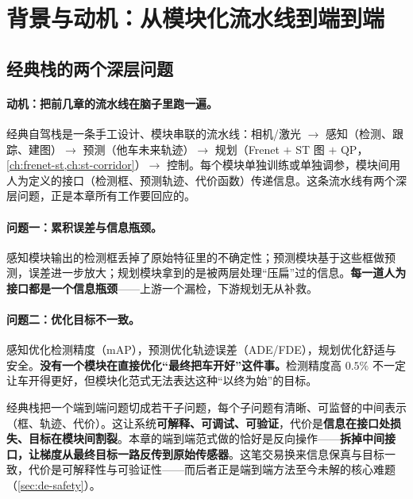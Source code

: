 \section{背景与动机：从模块化流水线到端到端}
\label{sec:de-background}

\subsection{经典栈的两个深层问题}
\label{sec:de-twoproblems}

\paragraph{动机：把前几章的流水线在脑子里跑一遍。}
经典自驾栈是一条手工设计、模块串联的流水线：相机/激光 $\to$ 感知（检测、跟踪、建图）$\to$ 预测（他车未来轨迹）$\to$ 规划（Frenet $+$ ST 图 $+$ QP，\cref{ch:frenet-st,ch:st-corridor}）$\to$ 控制。每个模块单独训练或单独调参，模块间用人为定义的接口（检测框、预测轨迹、代价函数）传递信息。这条流水线有两个深层问题，正是本章所有工作要回应的。

\paragraph{问题一：累积误差与信息瓶颈。}
感知模块输出的检测框丢掉了原始特征里的不确定性；预测模块基于这些框做预测，误差进一步放大；规划模块拿到的是被两层处理“压扁”过的信息。\textbf{每一道人为接口都是一个信息瓶颈}——上游一个漏检，下游规划无从补救。

\paragraph{问题二：优化目标不一致。}
感知优化检测精度（mAP），预测优化轨迹误差（ADE/FDE），规划优化舒适与安全。\textbf{没有一个模块在直接优化“最终把车开好”这件事。}检测精度高 $0.5\%$ 不一定让车开得更好，但模块化范式无法表达这种“以终为始”的目标。

\begin{insight}
经典栈把一个端到端问题切成若干子问题，每个子问题有清晰、可监督的中间表示（框、轨迹、代价）。这让系统\textbf{可解释、可调试、可验证}，代价是\textbf{信息在接口处损失、目标在模块间割裂}。本章的端到端范式做的恰好是反向操作——\textbf{拆掉中间接口，让梯度从最终目标一路反传到原始传感器}。这笔交易换来信息保真与目标一致，代价是可解释性与可验证性——而后者正是端到端方法至今未解的核心难题（\cref{sec:de-safety}）。
\end{insight}


